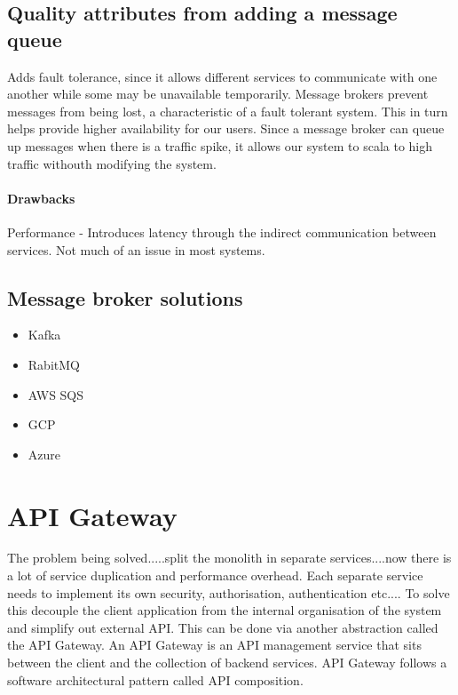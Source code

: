 \documentclass[a4paper, 11pt]{book}
\begin{document}
    \subsection{Quality attributes from adding a message queue}
    Adds fault tolerance, since it allows different services to communicate with one another while some may be unavailable temporarily.
    Message brokers prevent messages from being lost, a characteristic of a fault tolerant system.
    This in turn helps provide higher availability for our users.
    Since a message broker can queue up messages when there is a traffic spike, it allows our system to scala to high traffic withouth modifying the system.

    \paragraph{Drawbacks}
    Performance - Introduces latency through the indirect communication between services.
    Not much of an issue in most systems.

    \subsection{Message broker solutions}
    \begin{itemize}
        \item Kafka
        \item RabitMQ
        \item AWS SQS
        \item GCP
        \item Azure %
    \end{itemize}

    \section{API Gateway}
    The problem being solved.....split the monolith in separate services....now there is a lot of service duplication and performance overhead.
    Each separate service needs to implement its own security, authorisation, authentication etc....
    To solve this decouple the client application from the internal organisation of the system and simplify out external API.
    This can be done via another abstraction called the API Gateway.
    An API Gateway is an API management service that sits between the client and the collection of backend services.
    API Gateway follows a software architectural pattern called API composition.
\end{document}
